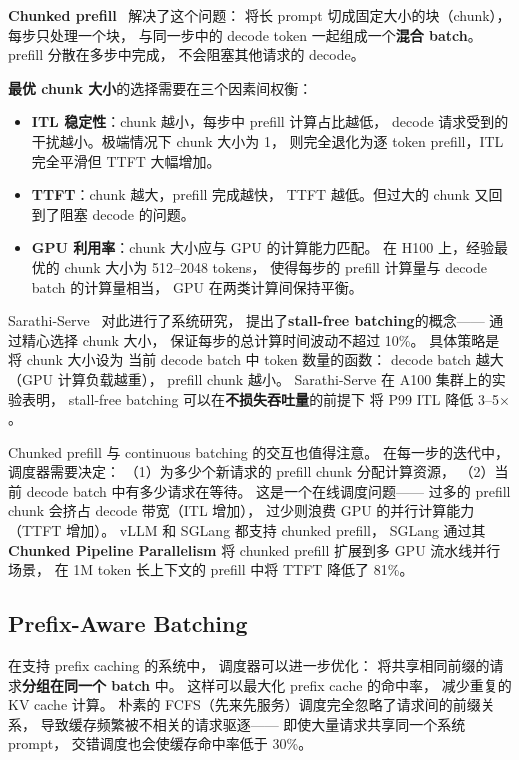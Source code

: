 \textbf{Chunked prefill}~\cite{agrawal2024sarathi} 解决了这个问题：
将长 prompt 切成固定大小的块（chunk），
每步只处理一个块，
与同一步中的 decode token 一起组成一个\textbf{混合 batch}。
prefill 分散在多步中完成，
不会阻塞其他请求的 decode。

\textbf{最优 chunk 大小}的选择需要在三个因素间权衡：
\begin{itemize}[noitemsep]
  \item \textbf{ITL 稳定性}：chunk 越小，每步中 prefill 计算占比越低，
        decode 请求受到的干扰越小。极端情况下 chunk 大小为 1，
        则完全退化为逐 token prefill，ITL 完全平滑但 TTFT 大幅增加。
  \item \textbf{TTFT}：chunk 越大，prefill 完成越快，
        TTFT 越低。但过大的 chunk 又回到了阻塞 decode 的问题。
  \item \textbf{GPU 利用率}：chunk 大小应与 GPU 的计算能力匹配。
        在 H100 上，经验最优的 chunk 大小为 512--2048 tokens，
        使得每步的 prefill 计算量与 decode batch 的计算量相当，
        GPU 在两类计算间保持平衡。
\end{itemize}

Sarathi-Serve~\cite{agrawal2024sarathi} 对此进行了系统研究，
提出了\textbf{stall-free batching}的概念——
通过精心选择 chunk 大小，
保证每步的总计算时间波动不超过 10\%。
具体策略是将 chunk 大小设为
当前 decode batch 中 token 数量的函数：
decode batch 越大（GPU 计算负载越重），
prefill chunk 越小。
Sarathi-Serve 在 A100 集群上的实验表明，
stall-free batching 可以在\textbf{不损失吞吐量}的前提下
将 P99 ITL 降低 3--5$\times$。

Chunked prefill 与 continuous batching 的交互也值得注意。
在每一步的迭代中，调度器需要决定：
（1）为多少个新请求的 prefill chunk 分配计算资源，
（2）当前 decode batch 中有多少请求在等待。
这是一个在线调度问题——
过多的 prefill chunk 会挤占 decode 带宽（ITL 增加），
过少则浪费 GPU 的并行计算能力（TTFT 增加）。
vLLM 和 SGLang 都支持 chunked prefill，
SGLang 通过其 \textbf{Chunked Pipeline Parallelism}
将 chunked prefill 扩展到多 GPU 流水线并行场景，
在 1M token 长上下文的 prefill 中将 TTFT 降低了 81\%。

\subsection{Prefix-Aware Batching}

在支持 prefix caching 的系统中，
调度器可以进一步优化：
将共享相同前缀的请求\textbf{分组在同一个 batch} 中。
这样可以最大化 prefix cache 的命中率，
减少重复的 KV cache 计算。
朴素的 FCFS（先来先服务）调度完全忽略了请求间的前缀关系，
导致缓存频繁被不相关的请求驱逐——
即使大量请求共享同一个系统 prompt，
交错调度也会使缓存命中率低于 30\%。

